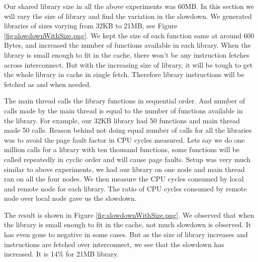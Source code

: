 Our shared library size in all the above experiments was 60MB.
In this section we will vary the size of library and find the variation in the slowdown.
We generated libraries of sizes varying from 32KB to 21MB, see Figure \ref{fig:slowdownWithSize.png}.
We kept the size of each function same at around 600 Bytes, and increased the number of functions available in each library.
When the library is small enough to fit in the cache, there won't be any instruction fetches across interconnect.
But with the increasing size of library, it will be tough to get the whole library in cache in single fetch.
Therefore library instructions will be fetched as and when needed.

The main thread calls the library functions in sequential order.
And number of calls made by the main thread is equal to the number of functions available in the library.
For example, our 32KB library had 50 functions and main thread made 50 calls.
Reason behind not doing equal number of calls for all the libraries was to avoid the page fault factor in CPU cycles measured.
Lets say we do one million calls for a library with ten thousand functions, some functions will be called repeatedly in cyclic order and will cause page faults.
Setup was very much similar to above experiments, we had our library on one node and main thread ran on all the four nodes.
We then measure the CPU cycles consumed by local and remote node for each library.
The ratio of CPU cycles consumed by remote node over local node gave us the slowdown.

The result is shown in Figure \ref{fig:slowdownWithSize.png}.
We observed that when the library is small enough to fit in the cache, not much slowdown is observed.
It has even gone to negative in some cases.
But as the size of library increases and instructions are fetched over interconnect, we see that the slowdown has increased.
It is 14\% for 21MB library.
